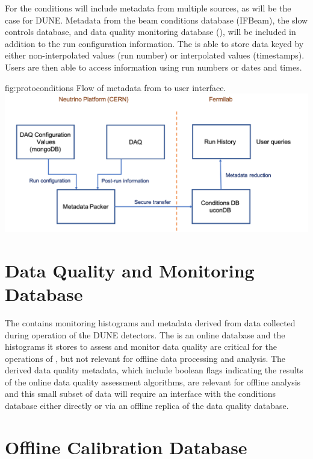 \documentclass[../main-v1.tex]{subfiles}
\begin{document}
For  the conditions  will include metadata from multiple sources, as will be the case for DUNE. Metadata from the beam conditions database (IFBeam), the slow controls database, and data quality monitoring database (), will be included in addition to the run configuration information. The  is able to store data keyed by either non-interpolated values (run number) or interpolated values (timestamps). Users are then able to access information using run numbers or dates and times.

\begin{dunefigure}
{fig:protoconditions} 
{Flow of metadata from   to user interface.}
\includegraphics[width=.9\columnwidth]{graphics/Databases/Conditions_ProtoDUNE.png}
\end{dunefigure}

\section{Data Quality and Monitoring Database  }
\label{sec:db:dqm}  

The  contains monitoring histograms and metadata derived from data collected during operation of the DUNE detectors. The   is an online database and
the histograms it stores to assess and monitor data quality are critical for the operations of , but not relevant for offline data processing and analysis.
The derived data quality metadata, which include boolean flags indicating the results of the online data quality assessment algorithms, are relevant for offline analysis and this small subset of  data will require an interface with the conditions database either directly or via an offline replica of the data quality database.

\section{Offline Calibration Database  }
\label{sec:db:calib} 
\end{document}

